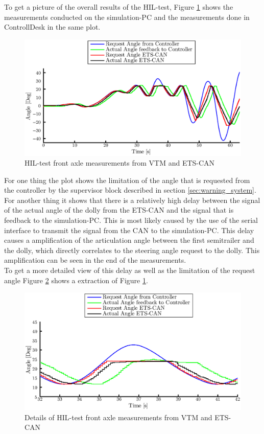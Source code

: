 \documentclass[ExampleMasters.tex]{subfiles}
\begin{document}
To get a picture of the overall results of the HIL-test, Figure \ref{fig:HIL002_complete} shows the measurements conducted on the simulation-PC and the measurements done in ControllDesk in the same plot.  
\begin{figure}[!htb]
	\centering
	\includegraphics[width=1\linewidth]{figures/HIL002_alles}
	\caption{HIL-test front axle measurements from VTM and ETS-CAN}	
	\label{fig:HIL002_complete}
\end{figure}

For one thing the plot shows the limitation of the angle that is requested from the controller by the supervisor block described in section \ref{sec:warning_system}. For another thing it shows that there is a relatively high delay between the signal of the actual angle of the dolly from the ETS-CAN and the signal that is feedback to the simulation-PC. This is most likely caused by the use of the serial interface to transmit the signal from the CAN to the simulation-PC. This delay causes a amplification of the articulation angle between the first semitrailer and the dolly, which directly correlates to the steering angle request to the dolly. This amplification can be seen in the end of the measurements.\\
To get a more detailed view of this delay as well as the limitation of the request angle Figure \ref{fig:HIL002_complete_details} shows a extraction of Figure \ref{fig:HIL002_complete}.   

\begin{figure}[!htb]
	\centering
	\includegraphics[width=1\linewidth]{figures/HIL002_alles_details}
	\caption{Details of HIL-test front axle measurements from VTM and ETS-CAN}
	
	\label{fig:HIL002_complete_details}
\end{figure}
\end{document}
